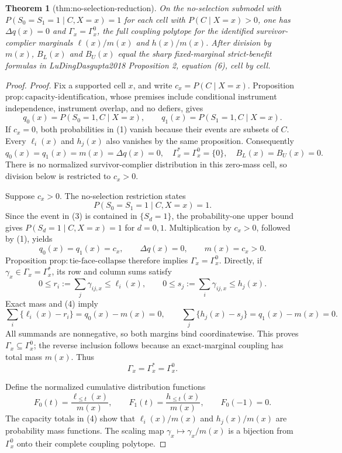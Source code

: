 \documentclass{article}
\newtheorem{theorem}{Theorem}
\begin{document}
\begin{theorem}[thm:no-selection-reduction]\label{thm:no-selection-reduction}
On the no-selection submodel with \(P(S_0=S_1=1\mid C,X=x)=1\) for each cell with \(P(C\mid X=x)>0\), one has \(\Delta q(x)=0\) and \(\Gamma_x=\Gamma_x^{0}\), the full coupling polytope for the identified survivor-complier marginals \(\ell(x)/m(x)\) and \(h(x)/m(x)\). After division by \(m(x)\), \(B_L(x)\) and \(B_U(x)\) equal the sharp fixed-marginal strict-benefit formulas in LuDingDasgupta2018 Proposition 2, equation (6), cell by cell.
\end{theorem}
\begin{proof}
\noindent\textit{Proof.}
Fix a supported cell \(x\), and write \(c_x=P(C\mid X=x)\).  Proposition
\(\mathrm{prop{:}capacity\text{-}identification}\), whose premises include
conditional instrument independence, instrument overlap, and no defiers,
gives
\[
q_0(x)=P(S_0=1,C\mid X=x),
\qquad
q_1(x)=P(S_1=1,C\mid X=x).
\tag{1}
\]
If \(c_x=0\), both probabilities in (1) vanish because their events are
subsets of \(C\).  Every \(\ell_i(x)\) and \(h_j(x)\) also vanishes by
the same proposition.  Consequently
\[
q_0(x)=q_1(x)=m(x)=\Delta q(x)=0,
\quad
\Gamma_x^{\ast}=\Gamma_x^{0}=\{0\},
\quad
B_L(x)=B_U(x)=0.
\tag{2}
\]
There is no normalized survivor-complier distribution in this zero-mass
cell, so division below is restricted to \(c_x>0\).

Suppose \(c_x>0\).  The no-selection restriction states
\[
P(S_0=S_1=1\mid C,X=x)=1.
\tag{3}
\]
Since the event in (3) is contained in \(\{S_d=1\}\), the probability-one
upper bound gives \(P(S_d=1\mid C,X=x)=1\) for \(d=0,1\).  Multiplication
by \(c_x>0\), followed by (1), yields
\[
q_0(x)=q_1(x)=c_x,
\qquad \Delta q(x)=0,
\qquad m(x)=c_x>0.
\tag{4}
\]
Proposition \(\mathrm{prop{:}tie\text{-}face\text{-}collapse}\) therefore
implies \(\Gamma_x=\Gamma_x^{0}\).  Directly, if
\(\gamma_x\in\Gamma_x=\Gamma_x^{\ast}\), its row and column sums satisfy
\[
0\le r_i:=\sum_j\gamma_{ij,x}\le\ell_i(x),
\qquad
0\le s_j:=\sum_i\gamma_{ij,x}\le h_j(x).
\]
Exact mass and (4) imply
\[
\sum_i\{\ell_i(x)-r_i\}=q_0(x)-m(x)=0,
\qquad
\sum_j\{h_j(x)-s_j\}=q_1(x)-m(x)=0.
\]
All summands are nonnegative, so both margins bind coordinatewise.  This
proves \(\Gamma_x\subseteq\Gamma_x^{0}\); the reverse inclusion follows
because an exact-marginal coupling has total mass \(m(x)\).  Thus
\[
\Gamma_x=\Gamma_x^{\ast}=\Gamma_x^{0}.
\tag{5}
\]

Define the normalized cumulative distribution functions
\[
F_0(t)=\frac{\ell_{\le t}(x)}{m(x)},
\qquad
F_1(t)=\frac{h_{\le t}(x)}{m(x)},
\qquad F_0(-1)=0.
\tag{6}
\]
The capacity totals in (4) show that \(\ell_i(x)/m(x)\) and
\(h_j(x)/m(x)\) are probability mass functions.  The scaling map
\(\gamma_x\mapsto\gamma_x/m(x)\) is a bijection from \(\Gamma_x^{0}\)
onto their complete coupling polytope.


\end{proof}
\end{document}
